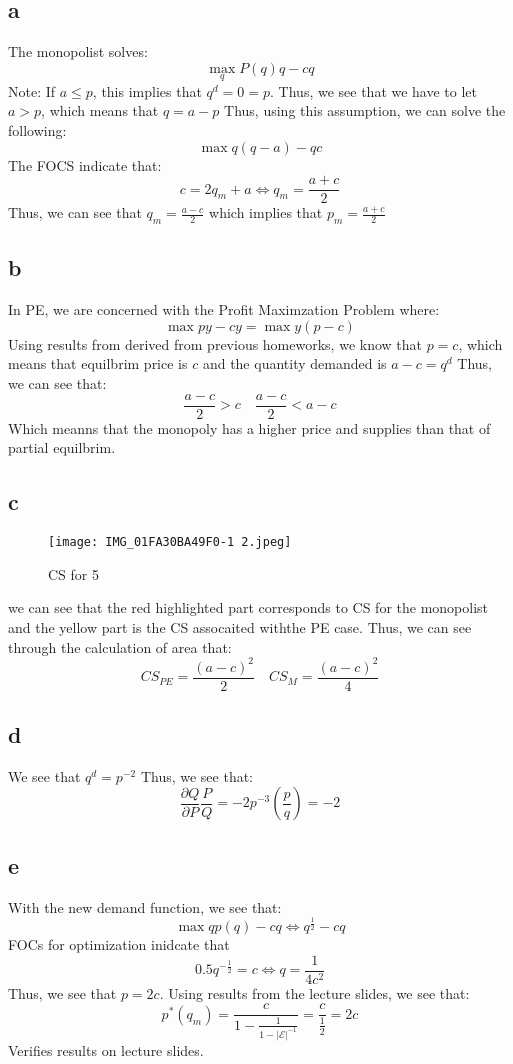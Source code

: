 \documentclass[11pt]{article}
\begin{document}
\section{}
\subsection*{a}
The monopolist solves:
\[
\max_q P(q) q - c q
\]
Note: If $a \leq p$, this implies that $q^d = 0 = p$. Thus, we see that we have to let $a > p$, which means that $ q = a - p$ Thus, using this assumption, we can solve the following:
\[
\max q(q - a) - qc
\]
The FOCS indicate that:
\[
c = 2q _m+ a \iff q_m = \frac{a+c}{2}
\]
Thus, we can see that $q_m = \frac{a-c}{2}$ which implies that $p_m = \frac{a+c}{2}$ 
\subsection*{b}
In PE, we are concerned with the Profit Maximzation Problem where:
\[
\max py - cy  = \max y(p -c)
\]
Using results from derived from previous homeworks, we know that $p = c$, which means that equilbrim price is $c$ and the quantity demanded is $a -c = q^d$ Thus, we can see that:
\[
\frac{a-c}{2} > c \quad \frac{a-c}{2} < a-c
\]
Which meanns that the monopoly has a higher price and supplies than that of partial equilbrim. 
\subsection*{c}
\begin{figure}[H]
    \centering
    \texttt{[image: IMG\_01FA30BA49F0-1 2.jpeg]}
    \caption{CS for 5}
    \label{fig:enter-2abel}
\end{figure}
we can see that the red highlighted part corresponds to CS for the monopolist and the yellow part is the CS assocaited withthe PE case. Thus, we can see through the calculation of area that:
\[
CS_{PE} = \frac{(a-c)^2}{2} \quad CS_M = \frac{(a-c)^2}{4}
\]
\subsection*{d}
We see that $q^d = p^{-2}$
Thus, we see that:
\[
\frac{\partial Q}{\partial P} \frac{P}{Q} = -2p^{-3} \left( \frac{p}{q} \right) = -2
\]
\subsection*{e}
With the new demand function, we see that:
\[
\max q p(q) - cq \iff q^\frac{1}{2} -cq 
\]
FOCs for optimization inidcate that
\[
0.5q^{-\frac{1}{2}} = c \iff q = \frac{1}{4c^2}
\]
Thus, we see that $p = 2c$. Using results from the lecture slides, we see that:
\[
p^*(q_m) = \frac{c}{1 - \frac{1}{1 -|\mathcal{E}|^{-1}}} = \frac{c}{\frac{1}{2}} = 2c
\]
Verifies results on lecture slides. 
\section{}

\section{}
\section{}
\end{document}
